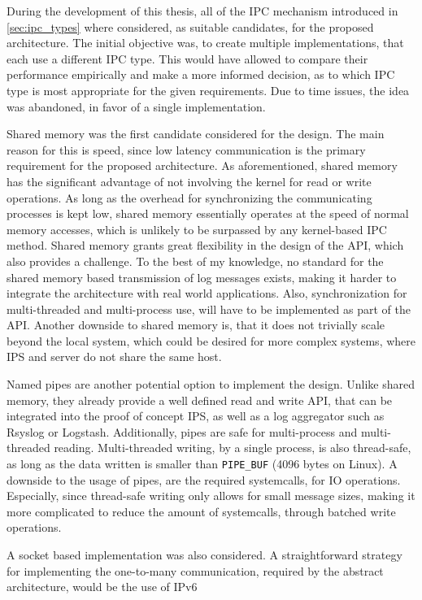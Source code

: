 During the development of this thesis, all of the \ac{IPC} mechanism introduced in \ref{sec:ipc_types} where considered, as suitable candidates, for the proposed architecture. The initial
objective was, to create multiple implementations, that each use a different \ac{IPC} type. This would have allowed to compare their performance empirically and make a more informed decision, as to 
which \ac{IPC} type is most appropriate for the given requirements.
Due to time issues, the idea was abandoned, in favor of a single implementation.
\par
Shared memory was the first candidate considered for the design. The main reason for this is speed, since low latency communication is 
the primary requirement for the proposed architecture. As aforementioned, shared memory has the significant advantage of not involving the 
kernel for read or write operations. As long as the overhead for synchronizing the communicating processes is kept low, shared memory essentially
operates at the speed of normal memory accesses, which is unlikely to be surpassed by any kernel-based \ac{IPC} method. Shared memory grants 
great flexibility in the design of the API, which also provides a challenge. To the best of my knowledge, no standard for the shared memory based
transmission of log messages exists, making it harder to integrate the architecture with real world applications. Also, synchronization for multi-threaded
and multi-process use, will have to be implemented as part of the API. Another downside to shared memory is, that
it does not trivially scale beyond the local system, which could be desired for more complex systems, where \ac{IPS} and server do not share the same host.
\par 
Named pipes are another potential option to implement the design. Unlike shared memory, they already provide a well defined read and write API,
that can be integrated into the proof of concept \ac{IPS}, as well as a log aggregator such as Rsyslog or Logstash. Additionally, pipes are safe for multi-process
and multi-threaded reading. Multi-threaded writing, by a single process, is also thread-safe, as long as the data written is smaller than \texttt{PIPE\_BUF} (4096 bytes on Linux)\cite{pipe}.
A downside to the usage of pipes, are the required systemcalls, for \ac{IO} operations. Especially, since thread-safe writing only allows for small message sizes, making it more complicated 
to reduce the amount of systemcalls, through batched write operations. 
\par  
A socket based implementation was also considered. A straightforward strategy for implementing the one-to-many communication, required by the abstract architecture, would be the use of \ac{IPv6}
